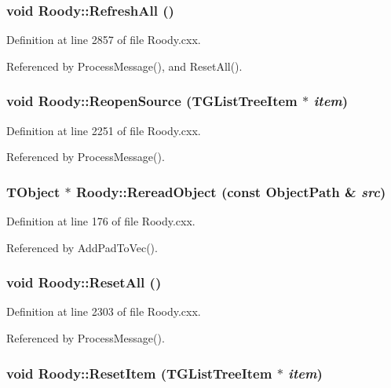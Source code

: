 \subsubsection[{RefreshAll}]{\setlength{\rightskip}{0pt plus 5cm}void Roody::RefreshAll ()}\label{classRoody_a649283dfe1b26d571571198d06e703bc}


Definition at line 2857 of file Roody.cxx.

Referenced by ProcessMessage(), and ResetAll().
\subsubsection[{ReopenSource}]{\setlength{\rightskip}{0pt plus 5cm}void Roody::ReopenSource (TGListTreeItem $\ast$ {\em item})\hspace{0.3cm}{\ttfamily  [private]}}\label{classRoody_ae4c8d9e2ca4f792ac19674fc54da803e}


Definition at line 2251 of file Roody.cxx.

Referenced by ProcessMessage().
\subsubsection[{RereadObject}]{\setlength{\rightskip}{0pt plus 5cm}TObject $\ast$ Roody::RereadObject (const ObjectPath \& {\em src})}\label{classRoody_abf1e1efd5a3be11f61588b64728cb562}


Definition at line 176 of file Roody.cxx.

Referenced by AddPadToVec().
\subsubsection[{ResetAll}]{\setlength{\rightskip}{0pt plus 5cm}void Roody::ResetAll ()\hspace{0.3cm}{\ttfamily  [private]}}\label{classRoody_a91cd43c209dbe69016e8e2a5f261cf44}


Definition at line 2303 of file Roody.cxx.

Referenced by ProcessMessage().
\subsubsection[{ResetItem}]{\setlength{\rightskip}{0pt plus 5cm}void Roody::ResetItem (TGListTreeItem $\ast$ {\em item})\hspace{0.3cm}{\ttfamily  [private]}}\label{classRoody_a21097a17d3513dd05bb4813643d4eb3f}


